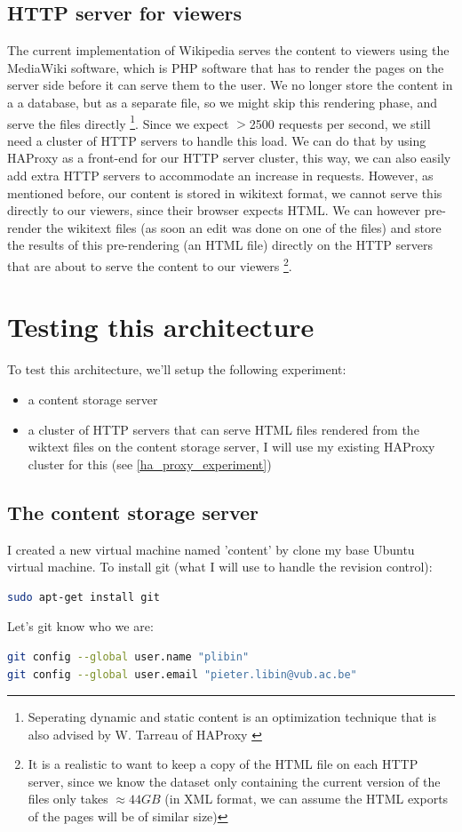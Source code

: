 \documentclass[12pt]{report}
\begin{document}
\subsection{HTTP server for viewers}
The current implementation of Wikipedia serves the content to viewers
using the MediaWiki software, which is PHP software that has to render
the pages on the server side before it can serve them to the user.
We no longer store the content in a a database, but as a separate file, so
we might skip this rendering phase, and serve the files directly
\footnote{Seperating dynamic and static content is an optimization
  technique that is also advised by W. Tarreau of HAProxy \cite{haproxy:2013}}. 
Since we expect $>$2500 requests per second, we still need a cluster of
HTTP servers to handle this load. We can do that by using HAProxy as a 
front-end for our HTTP server cluster, this way, we can also easily add
extra HTTP servers to accommodate an increase in requests.
However, as mentioned before, our content is stored in wikitext
format, we cannot serve this directly to our viewers, since their
browser expects HTML. We can however pre-render the wikitext files (as
soon an edit was done on one of the files) and store the results of
this pre-rendering (an HTML file) directly on the HTTP servers that
are about to serve the content to our viewers \footnote{It is a
  realistic to want to keep a copy of the HTML file on each HTTP server,
since we know the dataset only containing the current version of
the files only takes $\approx 44GB$ (in XML format, we can assume the
HTML exports of the pages will be of similar size)}.

\section{Testing this architecture}
To test this architecture, we'll setup the following experiment:
\begin{itemize}
\item a content storage server 
\item a cluster of HTTP servers that can serve HTML files rendered from
the wiktext files on the content storage server, I will use my
existing HAProxy cluster for this (see \cref{ha_proxy_experiment})
\end{itemize}

\subsection{The content storage server}
I created a new virtual machine named 'content' by clone my base
Ubuntu virtual machine.
To install git (what I will use to handle the revision control):
\begin{lstlisting}[language=bash]
sudo apt-get install git
\end{lstlisting}
Let's git know who we are:
\begin{lstlisting}[language=bash]
git config --global user.name "plibin"
git config --global user.email "pieter.libin@vub.ac.be"
\end{lstlisting}
\end{document}
